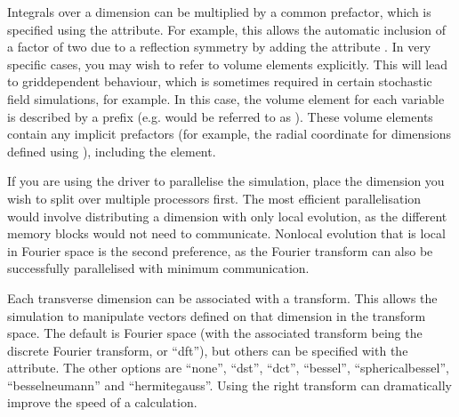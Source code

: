 \documentclass[letterpaper,10pt,english]{sphinxmanual}
\begin{document}
\ignorespaces 
\sphinxAtStartPar
Integrals over a dimension can be multiplied by a common prefactor, which is specified using the  attribute.  For example, this allows the automatic inclusion of a factor of two due to a reflection symmetry by adding the attribute .  In very specific cases, you may wish to refer to volume elements explicitly.  This will lead to grid\sphinxhyphen{}dependent behaviour, which is sometimes required in certain stochastic field simulations, for example.  In this case, the volume element for each variable is described by a  prefix (e.g.  would be referred to as ).  These volume elements contain any implicit prefactors (for example, the radial coordinate for dimensions defined using {\hyperref[\detokenize{reference_elements:besseltransform}]{}}), including the  element.

\sphinxAtStartPar
If you are using the  driver to parallelise the simulation, place the dimension you wish to split over multiple processors first.  The most efficient parallelisation would involve distributing a dimension with only local evolution, as the different memory blocks would not need to communicate.  Nonlocal evolution that is local in Fourier space is the second preference, as the Fourier transform can also be successfully parallelised with minimum communication.

\ignorespaces {}\label{\detokenize{reference_elements:transforms}}
\sphinxAtStartPar
Each transverse dimension can be associated with a transform.  This allows the simulation to manipulate vectors defined on that dimension in the transform space.  The default is Fourier space (with the associated transform being the discrete Fourier transform, or “dft”), but others can be specified with the  attribute.  The other options are “none”, “dst”, “dct”, “bessel”, “spherical\sphinxhyphen{}bessel”, “bessel\sphinxhyphen{}neumann” and “hermite\sphinxhyphen{}gauss”.  Using the right transform can dramatically improve the speed of a calculation.
\end{document}

